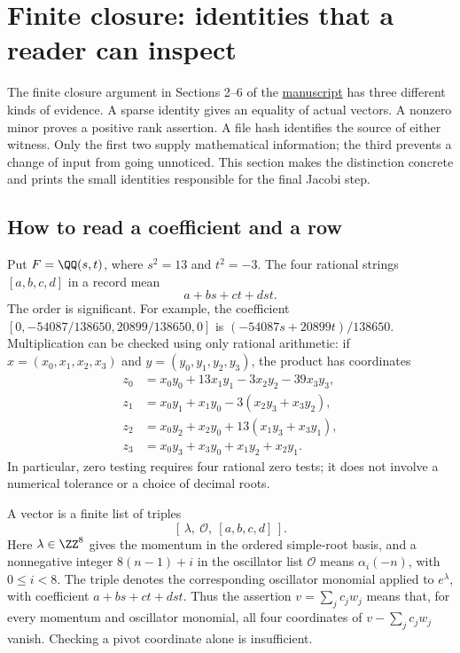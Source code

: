 \section{Finite closure: identities that a reader can inspect}
\label{sec:reader-finite}

The finite closure argument in Sections 2--6 of the
\href{hi_cft_c8_proof.pdf}{manuscript} has three different kinds of
evidence.  A sparse identity gives an equality of actual vectors.  A
nonzero minor proves a positive rank assertion.  A file hash identifies
the source of either witness.  Only the first two supply mathematical
information; the third prevents a change of input from going unnoticed.
This section makes the distinction concrete and prints the small
identities responsible for the final Jacobi step.

\subsection{How to read a coefficient and a row}

Put $F=\QQ(s,t)$, where $s^2=13$ and $t^2=-3$.  The four rational
strings $[a,b,c,d]$ in a record mean
\[
                  a+bs+ct+dst.
\]
The order is significant.  For example, the coefficient
$[0,-54087/138650,20899/138650,0]$ is
$(-54087s+20899t)/138650$.  Multiplication can be checked using
only rational arithmetic: if $x=(x_0,x_1,x_2,x_3)$ and
$y=(y_0,y_1,y_2,y_3)$, the product has coordinates
\begin{align*}
z_0&=x_0y_0+13x_1y_1-3x_2y_2-39x_3y_3,\\
z_1&=x_0y_1+x_1y_0-3(x_2y_3+x_3y_2),\\
z_2&=x_0y_2+x_2y_0+13(x_1y_3+x_3y_1),\\
z_3&=x_0y_3+x_3y_0+x_1y_2+x_2y_1.
\end{align*}
In particular, zero testing requires four rational zero tests; it
does not involve a numerical tolerance or a choice of decimal roots.

A vector is a finite list of triples
\[
       [\,\lambda,\ \mathcal O,\ [a,b,c,d]\,].
\]
Here $\lambda\in\ZZ^8$ gives the momentum in the ordered simple-root
basis, and a nonnegative integer $8(n-1)+i$ in the oscillator list
$\mathcal O$ means $\alpha_i(-n)$, with $0\leq i<8$.
The triple denotes the corresponding oscillator monomial applied to
$e^\lambda$, with coefficient $a+bs+ct+dst$.
Thus the assertion $v=\sum_jc_jw_j$ means that, for every momentum
and oscillator monomial, all four coordinates of
$v-\sum_jc_jw_j$ vanish.  Checking a pivot coordinate alone is
insufficient.

